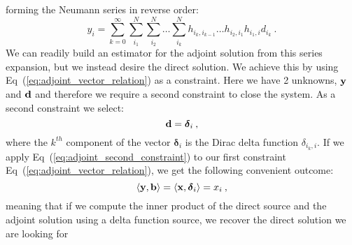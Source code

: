 forming the Neumann series in reverse order:
\begin{equation}
  y_i = \sum_{k=0}^{\infty}\sum_{i_1}^{N}\sum_{i_2}^{N}\ldots
  \sum_{i_k}^{N}h_{i_k,i_{k-1}}\ldots h_{i_2,i_1} h_{i_1,i} d_{i_k}\:.
  \label{eq:adjoint_neumann_solution}
\end{equation}
We can readily build an estimator for the adjoint solution from this
series expansion, but we instead desire the direct solution. We
achieve this by using Eq~(\ref{eq:adjoint_vector_relation}) as a
constraint. Here we have 2 unknowns, $\mathbf{y}$ and $\mathbf{d}$ and
therefore we require a second constraint to close the system. As a
second constraint we select:
\begin{equation}
  \mathbf{d} = \boldsymbol{\delta}_i\:,
  \label{eq:adjoint_second_constraint}
\end{equation}
where the $k^{th}$ component of the vector $\boldsymbol{\delta}_i$ is
the Dirac delta function $\delta_{i_k,i}$. If we apply
Eq~(\ref{eq:adjoint_second_constraint}) to our first constraint
Eq~(\ref{eq:adjoint_vector_relation}), we get the following convenient
outcome:
\begin{equation}
  \langle \mathbf{y}, \mathbf{b} \rangle = \langle \mathbf{x},
  \boldsymbol{\delta}_i \rangle = x_i \:,
  \label{eq:inner_product_constraint}
\end{equation}
meaning that if we compute the inner product of the direct source and
the adjoint solution using a delta function source, we recover the
direct solution we are looking for 

